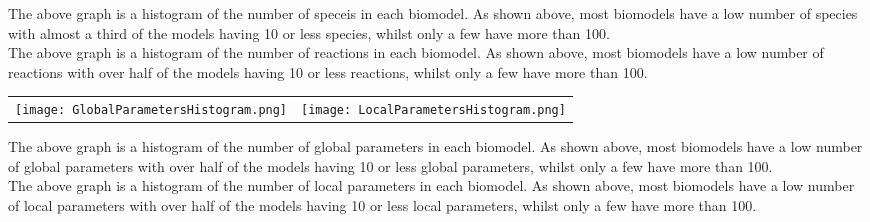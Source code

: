 \documentclass[portrait,a0paper,fontscale=0.35]{baposter}
\begin{document}
\begin{poster}
{ \begin{multicols}{2}
 The above graph is a histogram of the number of speceis in each biomodel. As shown above, most biomodels have a low number of species with almost a third of the models having 10 or less species, whilst only a few have more than 100.\\
   
 The above graph is a histogram of the number of reactions in each biomodel. As shown above, most biomodels have a low number of reactions with over half of the models having 10 or less reactions, whilst only a few have more than 100.\\
 
 \end{multicols}
 
 \begin{tabular}{l r}
 \texttt{[image: GlobalParametersHistogram.png]} & \texttt{[image: LocalParametersHistogram.png]}\\
 \end{tabular}
 
 \begin{multicols}{2}
 The above graph is a histogram of the number of global parameters in each biomodel. As shown above, most biomodels have a low number of global parameters with over half of the models having 10 or less global parameters, whilst only a few have more than 100.\\
      
  The above graph is a histogram of the number of local parameters in each biomodel. As shown above, most biomodels have a low number of local parameters with over half of the models having 10 or less local parameters, whilst only a few have more than 100.\\
 \end{multicols}
 }
 
 
 
\end{poster}
\end{document}
